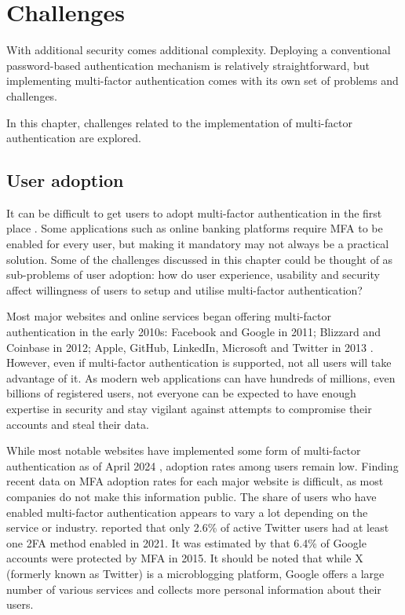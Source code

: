 \chapter{Challenges\label{ch:challenges}}

With additional security comes additional complexity. Deploying a conventional password-based authentication mechanism is relatively straightforward, but implementing multi-factor authentication comes with its own set of problems and challenges.

In this chapter, challenges related to the implementation of multi-factor authentication are explored.


\section{User adoption}

It can be difficult to get users to adopt multi-factor authentication in the first place \citep{golla_driving_2021}. Some applications such as online banking platforms require MFA to be enabled for every user, but making it mandatory may not always be a practical solution. Some of the challenges discussed in this chapter could be thought of as sub-problems of user adoption: how do user experience, usability and security affect willingness of users to setup and utilise multi-factor authentication?

Most major websites and online services began offering multi-factor authentication in the early 2010s: Facebook and Google in 2011; Blizzard and Coinbase in 2012; Apple, GitHub, LinkedIn, Microsoft and Twitter in 2013 \citep[Fig.~1]{petsas_two-factor_2015}. However, even if multi-factor authentication is supported, not all users will take advantage of it. As modern web applications can have hundreds of millions, even billions of registered users, not everyone can be expected to have enough expertise in security and stay vigilant against attempts to compromise their accounts and steal their data.

While most notable websites have implemented some form of multi-factor authentication as of April 2024 \citep{2factorauth_2fadirectory_2024}, adoption rates among users remain low. Finding recent data on MFA adoption rates for each major website is difficult, as most companies do not make this information public. The share of users who have enabled multi-factor authentication appears to vary a lot depending on the service or industry. \textcite{twitter_account_2022} reported that only 2.6\% of active Twitter users had at least one 2FA method enabled in 2021. It was estimated by \textcite[Table~1]{petsas_two-factor_2015} that 6.4\% of Google accounts were protected by MFA in 2015. It should be noted that while X (formerly known as Twitter) is a microblogging platform, Google offers a large number of various services and collects more personal information about their users.

